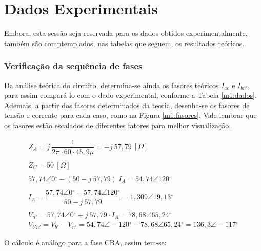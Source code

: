 \documentclass[a4paper,12pt,oneside,openany,table,xcdraw]{article}
\begin{document}
\newpage
\section{Dados Experimentais} \label{dados}
Embora, esta sessão seja reservada para os dados obtidos experimentalmente, também são comptemplados, nas tabelas que seguem, os resultados teóricos.

\subsubsection{Verificação da sequência de fases}
Da análise teórica do circuito, determina-se ainda os fasores teóricos $I_{ac}$ e $I_{bn'}$, para assim compará-lo com o dado experimental, conforme a Tabela \ref{m1:dados}. Ademais, a partir dos fasores determinados da teoria, desenha-se os fasores de tensão e corrente para cada caso, como na Figura \ref{m1:fasores}. Vale lembrar que os fasores estão escalados de diferentes fatores para melhor visualização.
\vspace{-0.4cm}

\begin{equation*}
\begin{array}{l}
Z_{A} =j\ \dfrac{1}{2\pi \cdot 60\cdot 45,9\mu } =-j\ 57,79\ [ \si{\Omega}]\\
\\
Z_{C} =50\ [ \si{\Omega}]\\
\\
57,74\angle 0\mathrm{^{\circ }} -( 50-j\ 57,79) \ I_{A} =54,74\angle 120\mathrm{^{\circ }}\\
\\
I_{A} =\dfrac{57,74\angle 0\mathrm{^{\circ }} -57,74\angle 120\mathrm{^{\circ }}}{50-j\ 57,79} =1,309\angle 19,13\mathrm{^{\circ }}\\
\\
V_{n'} =57,74\angle 0\mathrm{^{\circ }} +j\ 57,79\cdot I_{A} =78,68\angle 65,24\mathrm{^{\circ }}\\
V_{b'n'} =V_{b'} -V_{n'} =54,74\angle -120\mathrm{^{\circ }} -78,68\angle 65,24\mathrm{^{\circ }} =136,3\angle -117\mathrm{^{\circ }}
\end{array}
\end{equation*}

\vspace{0.4cm}
O cálculo é análogo para a fase CBA, assim tem-se:
\vspace{-0.4cm}
\end{document}
